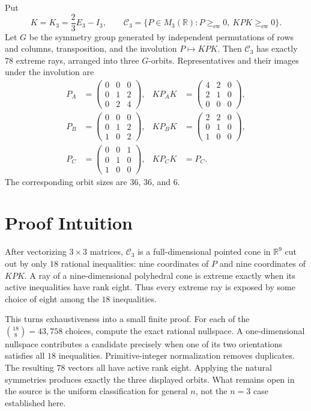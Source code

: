 \documentclass[11pt]{article}
\newcommand{\R}{\mathbb R}
\newcommand{\C}{\mathcal C}
\newcommand{\ew}{\mathrm{ew}}
\begin{document}
Put
\[
 K=K_3=\frac23E_3-I_3,
 \qquad
 \C_3=\{P\in M_3(\R):P\geq_{\ew}0,\ KPK\geq_{\ew}0\}.
\]
Let $G$ be the symmetry group generated by independent permutations of rows
and columns, transposition, and the involution $P\mapsto KPK$.  Then $\C_3$
has exactly $78$ extreme rays, arranged into three $G$-orbits.  Representatives
and their images under the involution are
\begin{align*}
P_A&=\begin{pmatrix}0&0&0\\0&1&2\\0&2&4\end{pmatrix},&
KP_AK&=\begin{pmatrix}4&2&0\\2&1&0\\0&0&0\end{pmatrix},\\[3pt]
P_B&=\begin{pmatrix}0&0&0\\0&1&2\\1&0&2\end{pmatrix},&
KP_BK&=\begin{pmatrix}2&2&0\\0&1&0\\1&0&0\end{pmatrix},\\[3pt]
P_C&=\begin{pmatrix}0&0&1\\0&1&0\\1&0&0\end{pmatrix},&
KP_CK&=P_C.
\end{align*}
The corresponding orbit sizes are $36$, $36$, and $6$.

\section*{Proof Intuition}

After vectorizing $3\times3$ matrices, $\C_3$ is a full-dimensional pointed
cone in $\R^9$ cut out by only $18$ rational inequalities: nine coordinates
of $P$ and nine coordinates of $KPK$.  A ray of a nine-dimensional
polyhedral cone is extreme exactly when its active inequalities have rank
eight.  Thus every extreme ray is exposed by some choice of eight among the
$18$ inequalities.

This turns exhaustiveness into a small finite proof.  For each of the
$\binom{18}{8}=43{,}758$ choices, compute the exact rational nullspace.  A
one-dimensional nullspace contributes a candidate precisely when one of its
two orientations satisfies all $18$ inequalities.  Primitive-integer
normalization removes duplicates.  The resulting $78$ vectors all have
active rank eight.  Applying the natural symmetries produces exactly the
three displayed orbits.  What remains open in the source is the uniform
classification for general $n$, not the $n=3$ case established here.
\end{document}
